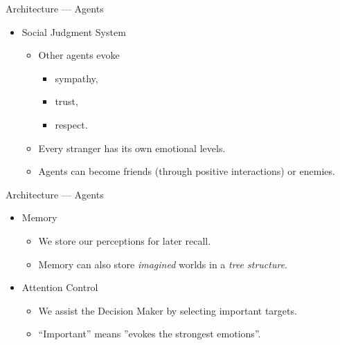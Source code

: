 \documentclass{beamer}
\def\tikzoverlay{%
   \tikz[baseline,overlay]\node[every overlay node]
}%
\begin{document}
   \begin{frame}{Architecture --- Agents}
      \begin{itemize}
         \item {Social Judgment System}
            \begin{itemize}
               \item Other agents evoke
                  \begin{itemize}
                     \item sympathy,
                     \item trust,
                     \item respect.
                  \end{itemize}
               \pause
               \item Every stranger has its own emotional levels.
               \item Agents can become friends (through positive interactions) or enemies.
            \end{itemize}
      \end{itemize}
      
   \end{frame}
   
   \begin{frame}{Architecture --- Agents}
      \begin{itemize}
         \item Memory
         \begin{itemize}
            \item We store our perceptions for later recall.
            \item Memory can also store \emph{imagined} worlds in a \emph{tree structure}.
         \end{itemize}
         \pause
         \item Attention Control
         \begin{itemize}
            \item We assist the Decision Maker by selecting important targets.
            \item ``Important'' means ''evokes the strongest emotions''.
         \end{itemize}
      \end{itemize}
      
   \end{frame}
   
\end{document}
